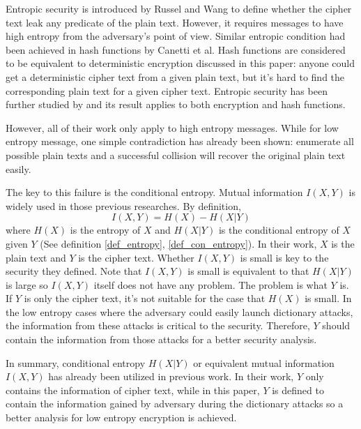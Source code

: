 \documentclass[10pt, conference, compsocconf]{IEEEtran}
\begin{document}
	Entropic security is introduced by Russel and Wang\cite{Russel02howto} to define
	whether the cipher text leak any predicate of the plain text. However,
	it requires messages to have high entropy from
	the adversary's point of view. Similar entropic condition had been
	achieved in hash functions by Canetti et al\cite{Canetti97towardsrealizing, Canetti_perfectlyone-way}. 
	Hash functions are
	considered to be equivalent to deterministic encryption discussed in this
	paper: anyone could get a deterministic cipher text from a
	given plain text, but it's hard to find the corresponding plain text
	for a given cipher text. Entropic security has been further 
	studied by \cite{entropic_wang}
	and its result applies to both encryption and hash functions.
	
	However, all of their work only apply to high entropy messages.
	While for low entropy message, 
	one simple contradiction has already been
	shown: enumerate all possible plain texts and a successful collision
	will recover the original plain text easily.
	
	The key to this failure is the conditional entropy. Mutual information
	$I(X, Y)$ is widely used in those previous researches. By definition,
	\begin{equation}
		I(X, Y) = H(X) - H(X|Y)
	\end{equation}
	where $H(X)$ is the entropy of $X$ and $H(X|Y)$ is the conditional entropy
	of $X$ given $Y$ (See definition \ref{def_entropy}, \ref{def_con_entropy}).
	In their work, $X$ is the plain text and $Y$ is the cipher text.
	Whether $I(X, Y)$ is small is key to the security they defined.
	Note that $I(X, Y)$ is small
	is equivalent to that $H(X|Y)$ is large so $I(X, Y)$ itself does not have any problem.
	The problem is what $Y$ is.
	If $Y$ is only the cipher text, it's not suitable for the case that $H(X)$ is small.
	In the low entropy cases where the adversary could easily launch dictionary attacks,
	the information from these attacks is critical to the security. Therefore, $Y$
	should contain the information from those attacks for a better security analysis.
		
	In summary, conditional entropy $H(X|Y)$ or equivalent mutual information $I(X, Y)$
	has already been utilized in previous work. In their work, $Y$ only
	contains the information of cipher text, while in this paper, $Y$ is defined to contain the information
	gained by adversary during the dictionary attacks so a better analysis
	for low entropy encryption is achieved.
	
\end{document}
